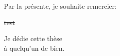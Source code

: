 \documentclass[11pt]{template/thesul}
\begin{document}

\begin{ThesisAcknowledgments}

	Par la présente, je souhaite remercier:
	\begin{todolist}
		\item \st{test}
	\end{todolist}

\end{ThesisAcknowledgments}


\begin{ThesisDedication}

	Je dédie cette thèse\\
	à quelqu'un de bien.

\end{ThesisDedication}


\renewcommand{\contentsname}{Table des matières}
\tableofcontents


\mainmatter


\end{document}

